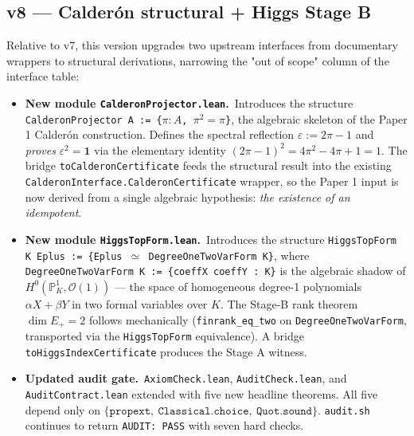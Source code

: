 \documentclass[11pt,a4paper]{article}
\begin{document}
\subsection*{v8 --- Calderón structural + Higgs Stage B}

Relative to v7, this version upgrades two upstream interfaces
from documentary wrappers to structural derivations, narrowing
the "out of scope" column of the interface table:

\begin{itemize}[leftmargin=1.6em, itemsep=2pt]
\item \textbf{New module \texttt{CalderonProjector.lean}.}\
    Introduces the structure
    \texttt{CalderonProjector A := \{\(\pi : A\), \(\pi^2 = \pi\)\}},
    the algebraic skeleton of the Paper 1 Calder\'on
    construction. Defines the spectral reflection
    $\varepsilon := 2\pi - 1$ and \emph{proves}
    $\varepsilon^2 = \mathbf 1$ via the elementary identity
    $(2\pi - 1)^2 = 4\pi^2 - 4\pi + 1 = 1$. The bridge
    \texttt{toCalderonCertificate} feeds the structural result
    into the existing
    \texttt{CalderonInterface.CalderonCertificate} wrapper, so
    the Paper 1 input is now derived from a single algebraic
    hypothesis: \emph{the existence of an idempotent}.

\item \textbf{New module \texttt{HiggsTopForm.lean}.}\
    Introduces the structure
    \texttt{HiggsTopForm K Eplus :=
            \{Eplus $\simeq$ DegreeOneTwoVarForm K\}},
    where
    \texttt{DegreeOneTwoVarForm K := \{coeffX coeffY : K\}}
    is the algebraic shadow of
    $H^0(\mathbb P^1_K, \mathcal O(1))$ --- the space of
    homogeneous degree-1 polynomials $\alpha X + \beta Y$ in
    two formal variables over $K$. The Stage-B rank theorem
    $\dim E_+ = 2$ follows mechanically (\texttt{finrank\_eq\_two}
    on \texttt{DegreeOneTwoVarForm}, transported via the
    \texttt{HiggsTopForm} equivalence). A bridge
    \texttt{toHiggsIndexCertificate} produces the Stage A
    witness.

\item \textbf{Updated audit gate.}\
    \texttt{AxiomCheck.lean}, \texttt{AuditCheck.lean}, and
    \texttt{AuditContract.lean} extended with five new headline
    theorems. All five depend only on
    $\{\texttt{propext},\ \texttt{Classical.choice},\
    \texttt{Quot.sound}\}$. \texttt{audit.sh} continues to
    return \texttt{AUDIT:\ PASS} with seven hard checks.
\end{itemize}
\end{document}

